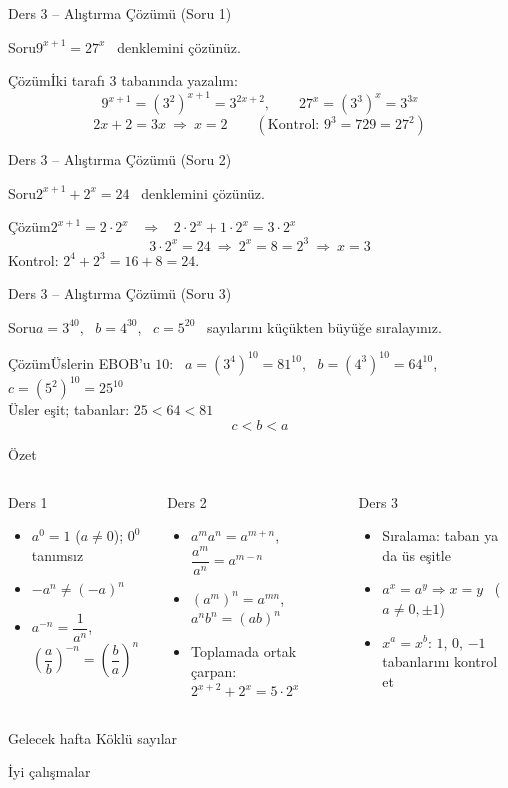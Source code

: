 \documentclass[aspectratio=169,11pt,handout]{beamer}
\newcommand{\soru}[3]{%
\begin{frame}{#1}
  \begin{block}{Soru}\large #2\end{block}
  \pause
  \begin{exampleblock}{Çözüm}\large #3\end{exampleblock}
\end{frame}}
\begin{document}
\soru{Ders 3 -- Alıştırma Çözümü (Soru 1)}
{\(9^{x+1}=27^{x}\) \ denklemini çözünüz.}
{İki tarafı \(3\) tabanında yazalım:
\[9^{x+1}=(3^2)^{x+1}=3^{2x+2},\qquad 27^{x}=(3^3)^{x}=3^{3x}\]
\[2x+2=3x\ \Rightarrow\ x=2\qquad(\text{Kontrol: } 9^3=729=27^2)\]}

\soru{Ders 3 -- Alıştırma Çözümü (Soru 2)}
{\(2^{x+1}+2^{x}=24\) \ denklemini çözünüz.}
{\(2^{x+1}=2\cdot 2^x\) \ \(\Rightarrow\) \ \(2\cdot 2^x+1\cdot 2^x=3\cdot 2^x\)
\[3\cdot 2^x=24\ \Rightarrow\ 2^x=8=2^3\ \Rightarrow\ x=3\]
Kontrol: \(2^4+2^3=16+8=24\).}

\soru{Ders 3 -- Alıştırma Çözümü (Soru 3)}
{\(a=3^{40}\), \ \(b=4^{30}\), \ \(c=5^{20}\) \ sayılarını küçükten büyüğe sıralayınız.}
{Üslerin EBOB'u \(10\): \ \(a=(3^4)^{10}=81^{10}\), \ \(b=(4^3)^{10}=64^{10}\), \ \(c=(5^2)^{10}=25^{10}\)\\[4pt]
Üsler eşit; tabanlar: \(25<64<81\)
\[c<b<a\]}


\begin{frame}{Özet}
\begin{columns}[t]
\begin{block}{Ders 1}
\begin{itemize}
\item \(a^0=1\) (\(a\neq 0\)); \(0^0\) tanımsız
\item \(-a^n\neq(-a)^n\)
\item \(a^{-n}=\dfrac{1}{a^n}\), \ \(\left(\dfrac ab\right)^{-n}=\left(\dfrac ba\right)^{n}\)
\end{itemize}
\end{block}
\begin{block}{Ders 2}
\begin{itemize}
\item \(a^m a^n=a^{m+n}\), \ \(\dfrac{a^m}{a^n}=a^{m-n}\)
\item \((a^m)^n=a^{mn}\), \ \(a^nb^n=(ab)^n\)
\item Toplamada ortak çarpan: \(2^{x+2}+2^x=5\cdot 2^x\)
\end{itemize}
\end{block}
\begin{block}{Ders 3}
\begin{itemize}
\item Sıralama: taban ya da üs eşitle
\item \(a^x=a^y\Rightarrow x=y\) \ (\(a\neq 0,\pm1\))
\item \(x^a=x^b\): \(1\), \(0\), \(-1\) tabanlarını kontrol et
\end{itemize}
\end{block}
\end{columns}
\vspace{6pt}
\begin{alertblock}{Gelecek hafta}
Köklü sayılar
\end{alertblock}
\end{frame}

\begin{frame}
\centering\Large İyi çalışmalar
\end{frame}
\end{document}
